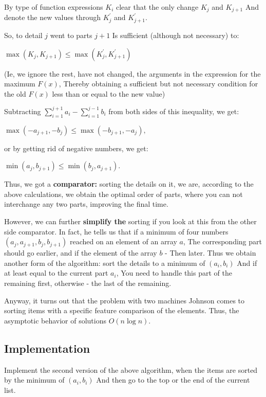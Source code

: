 By type of function expressions $K_i$ clear that the only change $K_j$ and $K_ {j +1}$ And denote the new values ​​through $K_j ^ \prime$ and $K_ {j +1} ^ \prime$.

So, to detail $j$ went to parts $j +1$ Is sufficient (although not necessary) to:

$\max(K_{j},K_{j+1})\leq\max(K_{j}^{'},K_{j+1}^{'})$

(Ie, we ignore the rest, have not changed, the arguments in the expression for the maximum $F (x)$, Thereby obtaining a sufficient but not necessary condition for the old $F (x)$ less than or equal to the new value)

Subtracting $\sum_ {i = 1} ^ {j +1} a_i - \sum_ {i = 1} ^ {j-1} b_i$ from both sides of this inequality, we get:

$\max (-a_ {j +1},-b_j) \le \max (-b_ {j +1},-a_j),$

or by getting rid of negative numbers, we get:

$\min (a_j, b_ {j +1}) \le \min (b_j, a_ {j +1}).$

Thus, we got a \textbf{comparator:} sorting the details on it, we are, according to the above calculations, we obtain the optimal order of parts, where you can not interchange any two parts, improving the final time.

However, we can further \textbf{simplify the} sorting if you look at this from the other side comparator. In fact, he tells us that if a minimum of four numbers $(a_j, a_ {j +1}, b_ {j}, b_ {j +1})$ reached on an element of an array $a$, The corresponding part should go earlier, and if the element of the array $b$ - Then later. Thus we obtain another form of the algorithm: sort the details to a minimum of $(a_i, b_i)$ And if at least equal to the current part $a_i$, You need to handle this part of the remaining first, otherwise - the last of the remaining.

Anyway, it turns out that the problem with two machines Johnson comes to sorting items with a specific feature comparison of the elements. Thus, the asymptotic behavior of solutions $O (n \log n)$.

\subsection{ Implementation }

Implement the second version of the above algorithm, when the items are sorted by the minimum of $(a_i, b_i)$ And then go to the top or the end of the current list.

